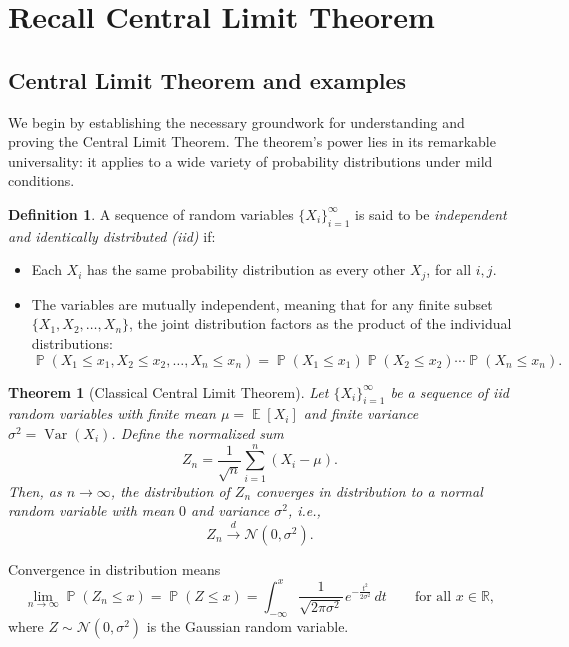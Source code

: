 \documentclass[letterpaper,11pt,oneside,reqno]{article}
\numberwithin{equation}{section}
\newcommand{\ssp}{\hspace{1pt}}
\newtheorem{theorem}[proposition]{Theorem}
\theoremstyle{definition}
\newtheorem{definition}[proposition]{Definition}
\begin{document}
\section{Recall Central Limit Theorem}

\subsection{Central Limit Theorem and examples}

We begin by establishing the necessary groundwork for understanding and proving
the Central Limit Theorem. The theorem's power lies in its remarkable universality:
it applies to a wide variety of probability distributions under mild conditions.

\begin{definition}
A sequence of random variables $\{X_i\}_{i=1}^{\infty}$ is said to be
\emph{independent and identically distributed (iid)}
if:

\begin{itemize}
    \item Each $X_i$ has the same probability distribution as every other $X_j$, for all $i, j$.
    \item The variables are mutually independent, meaning that for any finite subset $\{X_1, X_2, \dots, X_n\}$, the joint distribution factors as the product of the individual distributions:
    \[
			\operatorname{\mathbb{P}}(X_1 \leq x_1, X_2 \leq x_2, \dots, X_n \leq x_n)
			=
			\operatorname{\mathbb{P}}(X_1 \leq x_1)
			\operatorname{\mathbb{P}}(X_2 \leq x_2) \cdots \operatorname{\mathbb{P}}(X_n \leq x_n).
    \]
\end{itemize}
\end{definition}

\begin{theorem}[Classical Central Limit Theorem]
	Let $\{X_i\}_{i=1}^{\infty}$ be a sequence of iid random variables with finite mean $\mu = \operatorname{\mathbb{E}}[X_i]$ and finite
	variance $\sigma^2 = \operatorname{\mathrm{Var}}(X_i)$.
	Define the normalized sum
\begin{equation}
	\label{eq:normalized-sum}
	Z_n = \frac{1}{\sqrt{n}} \sum_{i=1}^n \left(X_i - \mu\right).
\end{equation}
Then, as $n \to \infty$, the distribution of $Z_n$ converges in distribution to a normal random variable with mean $0$ and variance $\sigma^2$, i.e.,
\[
Z_n \xrightarrow{d} \mathcal{N}(0, \sigma^2).
\]
\end{theorem}
Convergence in distribution means
\begin{equation}
	\label{eq:conv-in-dist}
	\lim_{n \to \infty} \operatorname{\mathbb{P}}(Z_n \leq x) = \operatorname{\mathbb{P}}(Z \leq x)
		= \int_{-\infty}^x \frac{1}{\sqrt{2\pi \sigma^2}}\ssp e^{-\frac{t^2}{2\sigma^2}} \, dt
	\qquad
	\text{for all } x \in \mathbb{R},
\end{equation}
where $Z \sim \mathcal{N}(0, \sigma^2)$ is the Gaussian random variable.
\end{document}

